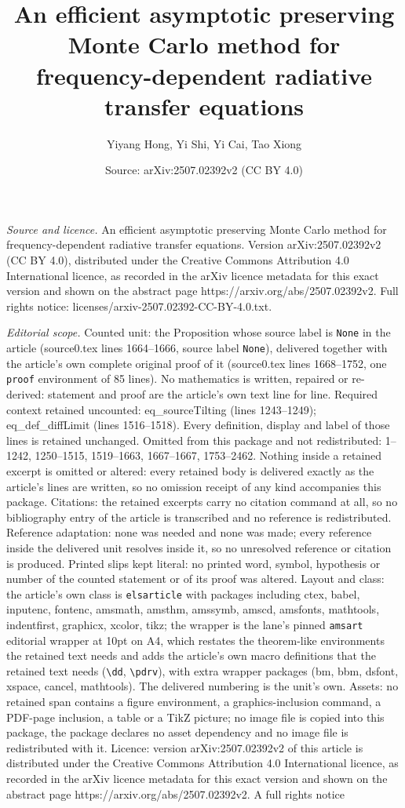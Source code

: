 \documentclass[10pt,a4paper]{amsart}
\title[An efficient asymptotic preserving Monte Carlo method for fr]{An efficient asymptotic preserving Monte Carlo method for frequency-dependent radiative transfer equations}
\author{Yiyang Hong, Yi Shi, Yi Cai, Tao Xiong}
\date{Source: arXiv:2507.02392v2 (CC BY 4.0)}
\begin{document}
\maketitle

\noindent\emph{Source and licence.} An efficient asymptotic preserving Monte Carlo method for frequency-dependent radiative transfer equations. Version arXiv:2507.02392v2 (CC BY 4.0), distributed under the Creative Commons Attribution 4.0 International licence, as recorded in the arXiv licence metadata for this exact version and shown on the abstract page https://arxiv.org/abs/2507.02392v2. Full rights notice: licenses/arxiv-2507.02392-CC-BY-4.0.txt.\par\smallskip

\noindent\textit{Editorial scope.} Counted unit: the Proposition whose source label is \texttt{None} in the article (source0.tex lines 1664--1666, source label \texttt{None}), delivered together with the article's own complete original proof of it (source0.tex lines 1668--1752, one \texttt{proof} environment of 85 lines). No mathematics is written, repaired or re-derived: statement and proof are the article's own text line for line. Required context retained uncounted: eq\_sourceTilting (lines 1243--1249); eq\_def\_diffLimit (lines 1516--1518). Every definition, display and label of those lines is retained unchanged. Omitted from this package and not redistributed: 1--1242, 1250--1515, 1519--1663, 1667--1667, 1753--2462. Nothing inside a retained excerpt is omitted or altered: every retained body is delivered exactly as the article's lines are written, so no omission receipt of any kind accompanies this package. Citations: the retained excerpts carry no citation command at all, so no bibliography entry of the article is transcribed and no reference is redistributed. Reference adaptation: none was needed and none was made; every reference inside the delivered unit resolves inside it, so no unresolved reference or citation is produced. Printed slips kept literal: no printed word, symbol, hypothesis or number of the counted statement or of its proof was altered. Layout and class: the article's own class is \texttt{elsarticle} with packages including ctex, babel, inputenc, fontenc, amsmath, amsthm, amssymb, amscd, amsfonts, mathtools, indentfirst, graphicx, xcolor, tikz; the wrapper is the lane's pinned \texttt{amsart} editorial wrapper at 10pt on A4, which restates the theorem-like environments the retained text needs and adds the article's own macro definitions that the retained text needs (\texttt{\textbackslash dd}, \texttt{\textbackslash pdrv}), with extra wrapper packages (bm, bbm, dsfont, xspace, cancel, mathtools). The delivered numbering is the unit's own. Assets: no retained span contains a figure environment, a graphics-inclusion command, a PDF-page inclusion, a table or a TikZ picture; no image file is copied into this package, the package declares no asset dependency and no image file is redistributed with it. Licence: version arXiv:2507.02392v2 of this article is distributed under the Creative Commons Attribution 4.0 International licence, as recorded in the arXiv licence metadata for this exact version and shown on the abstract page https://arxiv.org/abs/2507.02392v2. A full rights notice 
\end{document}
